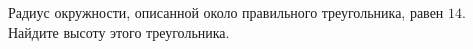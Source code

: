 \begin{ex}
	\begin{condition}
		Радиус окружности, описанной около правильного треугольника, равен \( 14 \). Найдите высоту этого треугольника.
	\end{condition}
\end{ex}